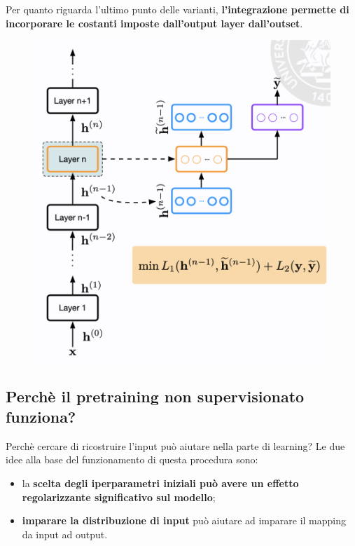 Per quanto riguarda l'ultimo punto delle varianti, \textbf{l'integrazione permette di incorporare le costanti
imposte dall'output layer dall'outset}.
\begin{figure}[!h]
  \includegraphics[scale=.4]{images/representation_learning/sup_unsup.png}
  \centering
\end{figure}
\newpage

\subsection{Perchè il pretraining non supervisionato funziona?}
Perchè cercare di ricostruire l'input può aiutare nella parte di learning? 
Le due idee alla base del funzionamento di questa procedura sono:
\begin{itemize}
  \item la \textbf{scelta degli iperparametri iniziali può avere un effetto regolarizzante significativo
  sul modello};
  \item \textbf{imparare la distribuzione di input} può aiutare ad imparare il mapping da input ad output.
\end{itemize}
